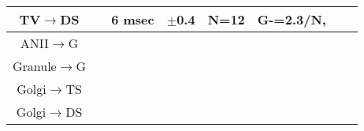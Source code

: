 \begin{longtable}{cXXXXXXX}
  TV\ensuremath{\rightarrow}DS   &                                                       \citep{ErikssonRobert:1999}                                                        &                                                     6 msec                                                      &                         $\pm$0.4                          &                   N=12                    &                                          G-=2.3/N,                                          &                                           & \\\hline 
 ANII\ensuremath{\rightarrow}G   &                                                                                                                                          &                                                                                                                 &                                                           &                                           &                                                                                             &                                           & \\\hline 
Granule\ensuremath{\rightarrow}G &                                                                                                                                          &                                                                                                                 &                                                           &                                           &                                                                                             &                                           & \\\hline 
Golgi\ensuremath{\rightarrow}TS  &                                                                                                                                          &                                                                                                                 &                                                           &                                           &                                                                                             &                                           & \\\hline 
Golgi\ensuremath{\rightarrow}DS  &                                                                                                                                          &                                                                                                                 &                                                           &                                           &                                                                                             &                                           & \\\hline
\end{longtable}

